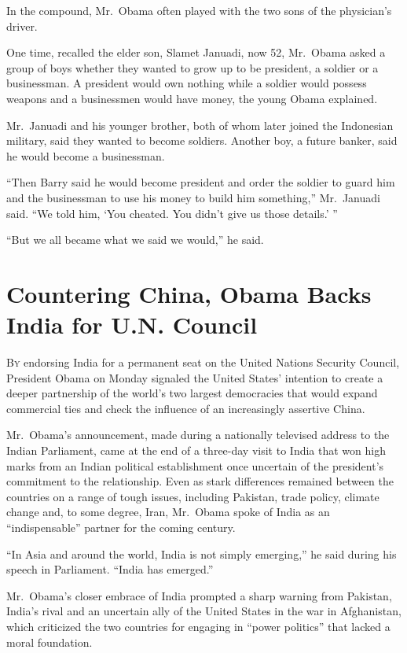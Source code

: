 ﻿\documentclass[12pt]{article}
\begin{document}
In the compound, Mr.~Obama often played with the two sons of the physician's driver.

One time, recalled the elder son, Slamet Januadi, now 52, Mr.~Obama asked a group of boys whether
they wanted to grow up to be president, a soldier or a businessman. A president would own nothing
while a soldier would possess weapons and a businessmen would have money, the young Obama explained.

Mr.~Januadi and his younger brother, both of whom later joined the Indonesian military, said they
wanted to become soldiers. Another boy, a future banker, said he would become a businessman.

``Then Barry said he would become president and order the soldier to guard him and the businessman
to use his money to build him something,'' Mr.~Januadi said. ``We told him, `You cheated. You didn't
give us those details.' ''

``But we all became what we said we would,'' he said.

\section{Countering China, Obama Backs India for U.N. Council}

\lettrine{B}{y} endorsing India for a permanent seat on the United Nations
Security Council, President Obama on Monday signaled the United States' intention to create a deeper
partnership of the world's two largest democracies that would expand commercial ties and check the
influence of an increasingly assertive China.

Mr.~Obama's announcement, made during a nationally televised address to the Indian Parliament, came
at the end of a three-day visit to India that won high marks from an Indian political establishment
once uncertain of the president's commitment to the relationship. Even as stark differences remained
between the countries on a range of tough issues, including Pakistan, trade policy, climate change
and, to some degree, Iran, Mr.~Obama spoke of India as an ``indispensable'' partner for the coming
century.

``In Asia and around the world, India is not simply emerging,'' he said during his speech in
Parliament. ``India has emerged.''

Mr.~Obama's closer embrace of India prompted a sharp warning from Pakistan, India's rival and an
uncertain ally of the United States in the war in Afghanistan, which criticized the two countries
for engaging in ``power politics'' that lacked a moral foundation.
\end{document}
